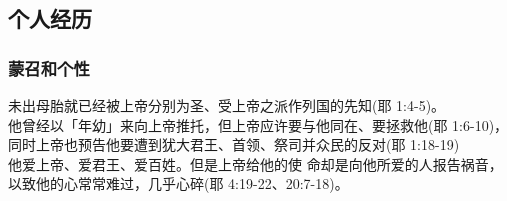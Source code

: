 \subsection{个人经历}
\subsubsection{蒙召和个性}
未出母胎就已经被上帝分别为圣、受上帝之派作列国的先知(耶 1:4-5)。\\
他曾经以「年幼」来向上帝推托，但上帝应许要与他同在、要拯救他(耶 1:6-10)，\\
同时上帝也预告他要遭到犹大君王、首领、祭司并众民的反对(耶 1:18-19)\\
他爱上帝、爱君王、爱百姓。但是上帝给他的使 命却是向他所爱的人报告祸音，以致他的心常常难过，几乎心碎(耶 4:19-22、20:7-18)。 \\

